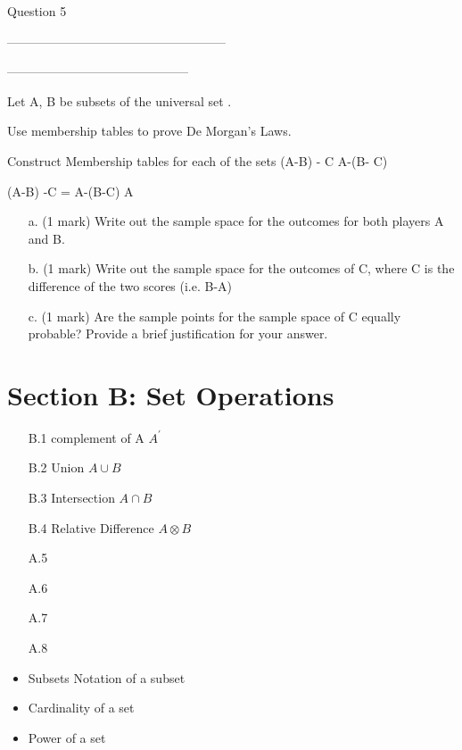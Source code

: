 {{{%

Question 5

-----------------------------------------------------


--------------------------------------------

Let A, B be subsets of the universal set .

Use membership tables to prove De Morgan's Laws.



Construct Membership tables for each of the sets
(A-B) - C
A-(B- C)

(A-B) -C = A-(B-C)
A



\begin{itemize}
\item[a.] (1 mark) Write out the sample space for the outcomes for both players A and B.
\item[b.] (1 mark) Write out the sample space for the outcomes of C, where C is the difference of the two scores (i.e. B-A)
\item[c.] (1 mark) Are the sample points for the sample space of C equally probable? Provide a brief justification for your answer.
\end{itemize}

\newpage
\section*{Section B: Set Operations}
\begin{itemize}
\item[B.1] complement of A $A^{\prime}$
\item[B.2] Union $A \cup B$
\item[B.3] Intersection $A \cap B$
\item[B.4] Relative Difference $A \otimes B$
\item[A.5]
\item[A.6]
\item[A.7]
\item[A.8]
\end{itemize}
\newpage



\begin{itemize}
\item Subsets Notation of a subset
\item Cardinality of a set
\item Power of a set
\end{itemize}

}}}
